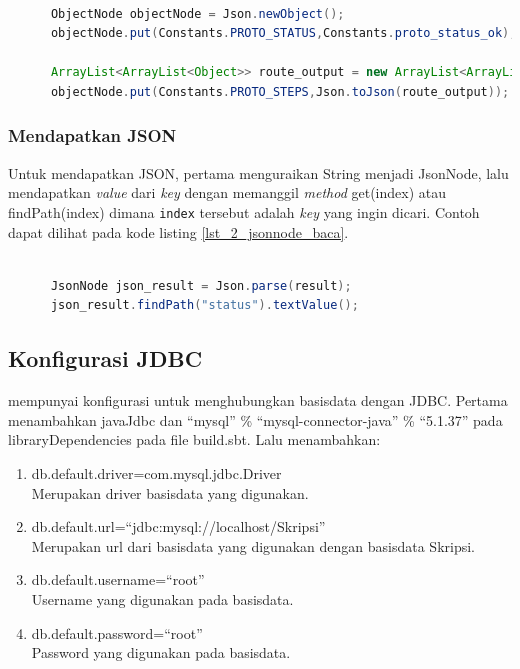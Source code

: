 \begin{lstlisting}[caption=Contoh menulis JSON menggunakan ObjectNode,label = {lst_2_jsonnode_nulis},language=Java]
	
      ObjectNode objectNode = Json.newObject();
      objectNode.put(Constants.PROTO_STATUS,Constants.proto_status_ok);
      
      ArrayList<ArrayList<Object>> route_output = new ArrayList<ArrayList<Object>>();
      objectNode.put(Constants.PROTO_STEPS,Json.toJson(route_output));
\end{lstlisting}

\subsubsection{Mendapatkan JSON}
Untuk mendapatkan JSON, pertama menguraikan String menjadi JsonNode, lalu mendapatkan \textit{value} dari \textit{key} dengan memanggil \textit{method} get(index) atau findPath(index) dimana \verb!index! tersebut adalah \textit{key} yang ingin dicari. Contoh dapat dilihat pada kode listing \ref{lst_2_jsonnode_baca}.

\begin{lstlisting}[caption=Contoh mendapatkan JSON menggunakan JsonNode,label = {lst_2_jsonnode_baca},language=Java]
	
      JsonNode json_result = Json.parse(result);
      json_result.findPath("status").textValue();
\end{lstlisting} 

\subsection{Konfigurasi JDBC}
\play mempunyai konfigurasi untuk menghubungkan basisdata dengan JDBC. Pertama menambahkan javaJdbc dan ``mysql'' \% ``mysql-connector-java'' \% ``5.1.37'' pada libraryDependencies pada file build.sbt. Lalu menambahkan:
\begin{enumerate}
	\item db.default.driver=com.mysql.jdbc.Driver\\
			Merupakan driver basisdata yang digunakan.
	\item db.default.url=``jdbc:mysql://localhost/Skripsi''\\
			Merupakan url dari basisdata yang digunakan dengan basisdata Skripsi.
	\item db.default.username=``root''\\
			Username yang digunakan pada basisdata.
	\item db.default.password=``root''\\
			Password yang digunakan pada basisdata.
\end{enumerate}


